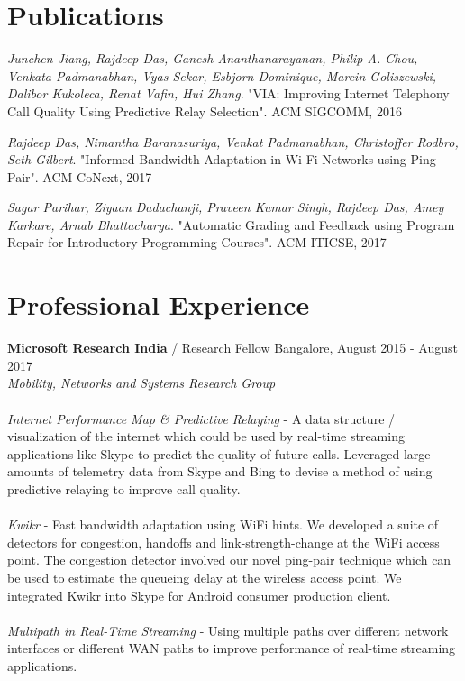 \documentclass[margin,line]{res}
\begin{document}
\begin{resume}
\section{\sc Publications}
{\em Junchen Jiang, Rajdeep Das, Ganesh Ananthanarayanan, Philip A. Chou, Venkata Padmanabhan, Vyas Sekar, Esbjorn Dominique, Marcin Goliszewski, Dalibor Kukoleca, Renat Vafin, Hui Zhang}.
"VIA: Improving Internet Telephony Call Quality Using Predictive Relay Selection". ACM SIGCOMM, 2016

{\em Rajdeep Das, Nimantha Baranasuriya, Venkat Padmanabhan, Christoffer Rodbro, Seth Gilbert}. "Informed Bandwidth Adaptation in Wi-Fi Networks using Ping-Pair". ACM CoNext, 2017

{\em Sagar Parihar, Ziyaan Dadachanji, Praveen Kumar Singh, Rajdeep Das, Amey Karkare, Arnab Bhattacharya}. "Automatic Grading and Feedback using Program Repair for Introductory Programming Courses". ACM ITICSE, 2017

\begin{comment}
\section{\sc Teaching Experience}
{\bf Indian Institute of Technology Kanpur} / Teaching Assistant {\hfill}{\em Kanpur}, 2013 - 2014 \\
Primary responsibility initially was to help students with solving programming problems and grading. Also helped students with weak concepts by tutoring them.
\end{comment}

\section{\sc Professional Experience}
{\bf Microsoft Research India} / Research Fellow {\hfill}Bangalore, August 2015 - August 2017 \\
{\em Mobility, Networks and Systems Research Group}\\
\\
{\em Internet Performance Map \& Predictive Relaying} - A data structure / visualization of the internet which could be used by real-time streaming applications like Skype to predict the quality of future calls. Leveraged large amounts of telemetry data from Skype and Bing to devise a method of using predictive relaying to improve call quality. \\
\\
{\em Kwikr} - Fast bandwidth adaptation using WiFi hints. We developed a suite of detectors for congestion, handoffs and link-strength-change at the WiFi access point. The congestion detector involved our novel ping-pair technique which can be used to estimate the queueing delay at the wireless access point. We integrated Kwikr into Skype for Android consumer production client. \\
\\
{\em Multipath in Real-Time Streaming} - Using multiple paths over different network interfaces or different WAN paths to improve performance of real-time streaming applications. 


\end{resume}
\end{document}
